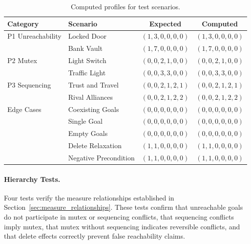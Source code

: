 \begin{table}[ht]
    \centering
    \begin{tabular}{llcc}
        \toprule
        \textbf{Category} & \textbf{Scenario}     & \textbf{Expected} & \textbf{Computed} \\
        \midrule
        P1 Unreachability & Locked Door           & $(1,3,0,0,0,0)$   & $(1,3,0,0,0,0)$   \\
                          & Bank Vault            & $(1,7,0,0,0,0)$   & $(1,7,0,0,0,0)$   \\
        P2 Mutex          & Light Switch          & $(0,0,2,1,0,0)$   & $(0,0,2,1,0,0)$   \\
                          & Traffic Light         & $(0,0,3,3,0,0)$   & $(0,0,3,3,0,0)$   \\
        P3 Sequencing     & Trust and Travel      & $(0,0,2,1,2,1)$   & $(0,0,2,1,2,1)$   \\
                          & Rival Alliances       & $(0,0,2,1,2,2)$   & $(0,0,2,1,2,2)$   \\
        Edge Cases        & Coexisting Goals      & $(0,0,0,0,0,0)$   & $(0,0,0,0,0,0)$   \\
                          & Single Goal           & $(0,0,0,0,0,0)$   & $(0,0,0,0,0,0)$   \\
                          & Empty Goals           & $(0,0,0,0,0,0)$   & $(0,0,0,0,0,0)$   \\
                          & Delete Relaxation     & $(1,1,0,0,0,0)$   & $(1,1,0,0,0,0)$   \\
                          & Negative Precondition & $(1,1,0,0,0,0)$   & $(1,1,0,0,0,0)$   \\
        \bottomrule
    \end{tabular}
    \caption{Computed profiles for test scenarios.}
    \label{tab:validation_results}
\end{table}

\paragraph{Hierarchy Tests.}
Four tests verify the measure relationships established in Section~\ref{sec:measure_relationships}. These tests confirm that unreachable goals do not participate in mutex or sequencing conflicts, that sequencing conflicts imply mutex, that mutex without sequencing indicates reversible conflicts, and that delete effects correctly prevent false reachability claims.

